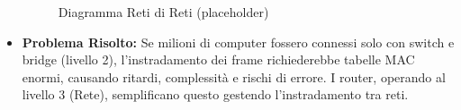 \begin{itemize}
\begin{itemize}
    \end{itemize}
    \begin{figure}[H]
        \centering
        \caption{Diagramma Reti di Reti (placeholder)}
    \end{figure}
    \item \textbf{Problema Risolto:} Se milioni di computer fossero connessi solo con switch e bridge (livello 2), l'instradamento dei frame richiederebbe tabelle MAC enormi, causando ritardi, complessità e rischi di errore. I router, operando al livello 3 (Rete), semplificano questo gestendo l'instradamento tra reti.
\end{itemize}

